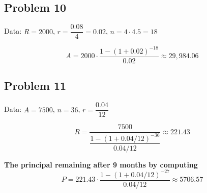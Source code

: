 \documentclass[12pt]{article}
\begin{document}
\subsection*{Problem 10}
Data: \( R = 2000 \), \( r = \dfrac{0.08}{4} = 0.02 \), \( n = 4 \cdot 4.5 = 18 \)

\[
A = 2000 \cdot \dfrac{1 - (1 + 0.02)^{-18}}{0.02} \approx \boxed{29{,}984.06}
\]

\subsection*{Problem 11}
Data: \( A = 7500 \), \( n = 36 \), \( r = \dfrac{0.04}{12} \)

\[
R = \dfrac{7500}{\dfrac{1 - (1 + 0.04/12)^{-36}}{0.04/12}} \approx \boxed{221.43}
\]

\textbf{The principal remaining after 9 months by computing}
\[
P = 221.43 \cdot \dfrac{1 - (1 + 0.04/12)^{-27}}{0.04/12} \approx \boxed{5706.57}
\]
\end{document}

